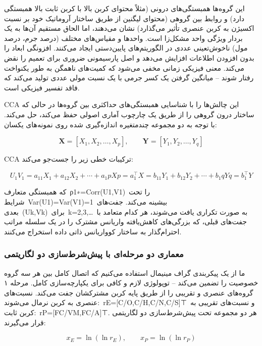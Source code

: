 \documentclass[12pt, a4paper]{article}
\begin{document}
این گروه‌ها همبستگی‌های درونی (مثلاً محتوای کربن بالا با کربن ثابت بالا همبستگی دارد) و روابط بین گروهی (محتوای لیگنین از طریق ساختار آروماتیک خود بر نسبت اکسیژن به کربن عنصری تأثیر می‌گذارد) نشان می‌دهند، اما الحاق مستقیم آن‌ها به یک بردار ویژگی واحد مشکل‌زا است. واحدها و مقیاس‌های مختلف (درصد جرم، درصد مول) ناخوش‌تعینی عددی در الگوریتم‌های پایین‌دستی ایجاد می‌کنند. افزونگی ابعاد را بدون افزودن اطلاعات افزایش می‌دهد و اصل پارسیمونی ضروری برای تعمیم را نقض می‌کند. معنی فیزیکی زمانی مخفی می‌شود که کمیت‌های ناهمگن به طور یکنواخت رفتار شوند – میانگین گرفتن یک کسر جرمی با یک نسبت مولی عددی تولید می‌کند که فاقد تفسیر فیزیکی است.

CCA این چالش‌ها را با شناسایی همبستگی‌های حداکثری بین گروه‌ها در حالی که ساختار درون گروهی را از طریق یک چارچوب آماری اصولی حفظ می‌کند، حل می‌کند. با توجه به دو مجموعه چندمتغیره اندازه‌گیری شده روی نمونه‌های یکسان:

\begin{equation}
\mathbf{X}=[X_{1},X_{2},\ldots,X_{p}],\qquad \mathbf{Y}=[Y_{1},Y_{2},\ldots,Y_{q}]
\end{equation}

CCA ترکیبات خطی زیر را جست‌جو می‌کند:

\begin{equation}
U_{1}V_{1}=a_{11}X_{1}+a_{12}X_{2}+\cdots+a_{1}pXp=a_{1}^{\top}X=b_{11}Y_{1}+b_{12}Y_{2}+\cdots+b_{1}qYq=b_{1}^{\top}Y\tag{1}
\end{equation}

که همبستگی متعارف ρ1∗=Corr(U1,V1) را تحت شرایط Var(U1)=Var(V1)=1 بیشینه می‌کند. جفت‌های بعدی (Uk,Vk) برای k=2,3,… به صورت تکراری یافت می‌شوند، هر کدام متعامد با جفت‌های قبلی، که بزرگی‌های کاهش‌یافته واریانس مشترک را در یک سلسله مراتب احترام‌گذار به ساختار کوواریانس ذاتی داده استخراج می‌کنند.

\subsubsection{معماری دو مرحله‌ای با پیش‌شرط‌سازی دو لگاریتمی}

ما از یک پیکربندی گراف مینیمال استفاده می‌کنیم که اتصال کامل بین هر سه گروه خصوصیت را تضمین می‌کند – توپولوژی لازم و کافی برای یکپارچه‌سازی کامل. مرحله ۱ گروه‌های عنصری و تقریبی را از طریق پایه کربن مشترکشان جفت می‌کند. نسبت‌های عنصری به کربن نرمال می‌شوند: rE=[C/O,C/H,C/N,C/S]⊤ و نسبت‌های تقریبی به کربن ثابت: rP=[FC/VM,FC/A]⊤. هر دو مجموعه تحت پیش‌شرط‌سازی دو لگاریتمی قرار می‌گیرند:

\begin{equation}
x_{E}=\ln(\ln r_{E}),\qquad x_{P}=\ln(\ln r_{P})
\end{equation}
\end{document}
